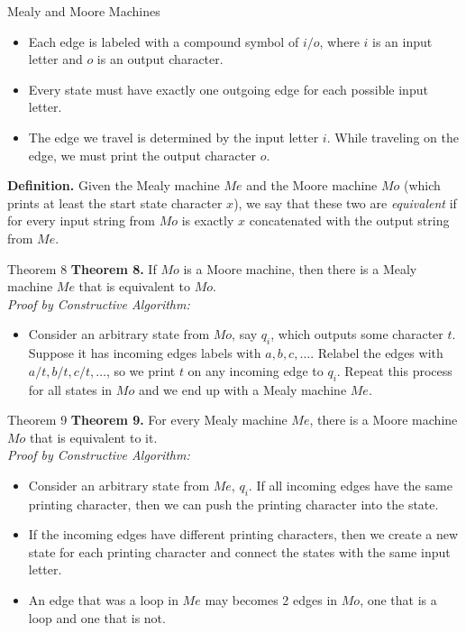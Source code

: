 \documentclass{article}
\begin{document}
\begin{multicols*}{3}
\begin{blackbox}{Mealy and Moore Machines}
    \begin{itemize}[leftmargin=9pt]
        \item Each edge is labeled with a compound symbol of $i/o$, where $i$ is an input letter and $o$ is an output character.
        \item Every state must have exactly one outgoing edge for each possible input letter.
        \item The edge we travel is determined by the input letter $i$. While traveling on the edge, we must print the output character $o$.
    \end{itemize}
    \textbf{Definition.} Given the Mealy machine $Me$ and the Moore machine $Mo$ (which prints at least the start state character $x$), we say that these two are \emph{equivalent} if for every input string from $Mo$ is exactly $x$ concatenated with the output string from $Me$.
    \begin{bluebox}{Theorem 8}
        \textbf{Theorem 8.} If $Mo$ is a Moore machine, then there is a Mealy machine $Me$ that is equivalent to $Mo$.\\[1ex]
        \textit{Proof by Constructive Algorithm:} 
        \begin{itemize}[leftmargin=5pt]
            \item Consider an arbitrary state from $Mo$, say $q_i$, which outputs some character $t$. Suppose it has incoming edges labels with $a,b,c,\ldots$. Relabel the edges with $a/t, b/t, c/t,\ldots$, so we print $t$ on any incoming edge to $q_i$. Repeat this process for all states in $Mo$ and we end up with a Mealy machine $Me$.
        \end{itemize}
    \end{bluebox}
    \begin{redbox}{Theorem 9}
        \textbf{Theorem 9.} For every Mealy machine $Me$, there is a Moore machine $Mo$ that is equivalent to it.\\[1ex]
        \textit{Proof by Constructive Algorithm:}
        \begin{itemize}[leftmargin=5pt]
            \item Consider an arbitrary state from $Me$, $q_i$. If all incoming edges have the same printing character, then we can push the printing character into the state.
            \item If the incoming edges have different printing characters, then we create a new state for each printing character and connect the states with the same input letter.
            \item An edge that was a loop in $Me$ may becomes 2 edges in $Mo$, one that is a loop and one that is not.

\end{itemize}
\end{redbox}
\end{blackbox}
\end{multicols*}
\end{document}
